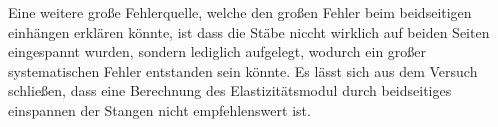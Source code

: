 \noindent
Eine weitere große Fehlerquelle, welche den großen Fehler beim beidseitigen einhängen erklären könnte, ist dass die Stäbe niccht wirklich auf beiden Seiten eingespannt wurden,
sondern lediglich aufgelegt, wodurch ein großer systematischen Fehler entstanden sein könnte. Es lässt sich aus dem Versuch schließen, dass eine Berechnung des Elastizitätsmodul 
durch beidseitiges einspannen der Stangen nicht empfehlenswert ist.

%


